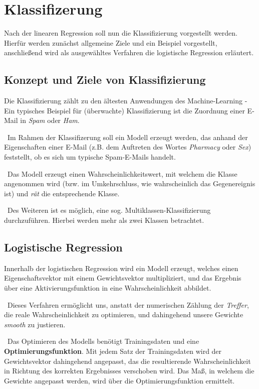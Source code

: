 \section{Klassifizerung}
\label{sec:Klassifizierung}
Nach der linearen Regression soll nun die Klassifizierung vorgestellt werden. Hierfür werden zunächst allgemeine Ziele und ein Beispiel vorgestellt, anschließend wird als ausgewähltes Verfahren die logistische Regression erläutert. 
 
\subsection{Konzept und Ziele von Klassifizierung}
Die Klassifizierung zählt zu den ältesten Anwendungen des Machine-Learning - Ein typisches Beispiel für (überwachte) Klassifizierung ist die Zuordnung einer E-Mail in \textit{Spam} oder \textit{Ham}.

~\newline Im Rahmen der Klassifizerung soll ein Modell erzeugt werden, das anhand der Eigenschaften einer E-Mail (z.B. dem Auftreten des Wortes \textit{Pharmacy} oder \textit{Sex}) feststellt, ob es sich um typische Spam-E-Mails handelt. 

~\newline Das Modell erzeugt einen Wahrscheinlichkeitswert, mit welchem die Klasse angenommen wird (bzw. im Umkehrschluss, wie wahrscheinlich das Gegenereignis ist) und \textit{rät} die entsprechende Klasse. 

~\newline Des Weiteren ist es möglich, eine sog. Multiklassen-Klassifizierung durchzuführen. Hierbei werden mehr als zwei Klassen betrachtet. 
\subsection{Logistische Regression}
\label{subsec:LogRegAcc}
Innerhalb der logistischen Regression wird ein Modell erzeugt, welches einen Eigenschaftsvektor mit einem Gewichtsvektor multipliziert, und das Ergebnis über eine Aktivierungsfunktion in eine Wahrscheinlichkeit abbildet. 

~\newline Dieses Verfahren ermöglicht uns, anstatt der numerischen Zählung der \textit{Treffer}, die reale Wahrscheinlichkeit zu optimieren, und dahingehend unsere Gewichte \textit{smooth} zu justieren. 

~\newline Das Optimieren des Modells benötigt Trainingsdaten und eine \textbf{Optimierungsfunktion}. Mit jedem Satz der Trainingsdaten wird der Gewichtsvektor dahingehend angepasst, das die resultierende Wahrscheinlichkeit in Richtung des korrekten Ergebnisses verschoben wird. Das Maß, in welchem die Gewichte angepasst werden, wird über die Optimierungsfunktion ermittelt. 

